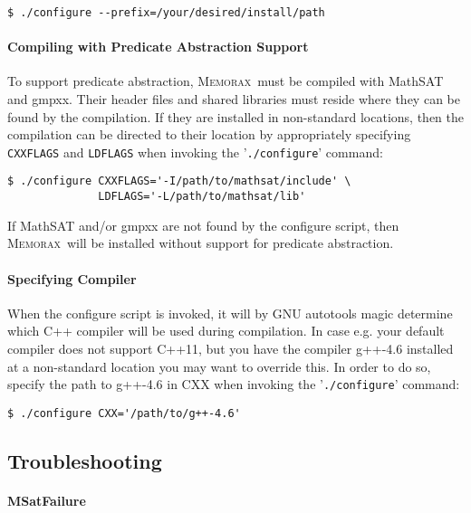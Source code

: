 \documentclass[a4paper]{article}
\newcommand{\memorax}{\textsc{Memorax}}
\begin{document}
\begin{verbatim}
$ ./configure --prefix=/your/desired/install/path
\end{verbatim}

\paragraph{Compiling with Predicate Abstraction Support}

   To support predicate abstraction, \memorax\ must be compiled with
   MathSAT and gmpxx. Their header files and shared libraries must
   reside where they can be found by the compilation. If they are
   installed in non-standard locations, then the compilation can be
   directed to their location by appropriately specifying
   \verb+CXXFLAGS+ and \verb+LDFLAGS+ when invoking the
   '\verb+./configure+' command:

\begin{verbatim}
$ ./configure CXXFLAGS='-I/path/to/mathsat/include' \
              LDFLAGS='-L/path/to/mathsat/lib'
\end{verbatim}

   If MathSAT and/or gmpxx are not found by the configure script, then
   \memorax\ will be installed without support for predicate abstraction.

\paragraph{Specifying Compiler}

   When the configure script is invoked, it will by GNU autotools
   magic determine which C++ compiler will be used during
   compilation. In case e.g. your default compiler does not support
   C++11, but you have the compiler g++-4.6 installed at a
   non-standard location you may want to override this. In order to do
   so, specify the path to g++-4.6 in CXX when invoking the
   '\verb+./configure+' command:

\begin{verbatim}
$ ./configure CXX='/path/to/g++-4.6'
\end{verbatim}

\subsection{Troubleshooting}

\paragraph{MSatFailure}
\end{document}
